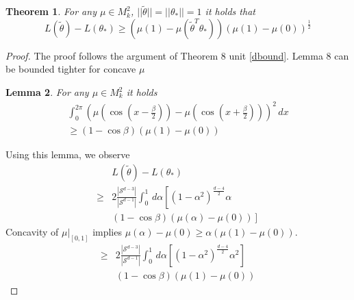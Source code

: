 \documentclass[twoside]{article} \usepackage{aistats2017}
\newtheorem{theorem}{Theorem}
\newtheorem{lemma}[theorem]{Lemma}
\begin{document}
\begin{theorem}
For any $\mu \in M_k^2$, $||\tilde{\theta}||=||\theta_*||=1$ it holds that
$$L(\tilde{\theta})-L(\theta_*) \geq (\mu(1)-\mu(\tilde{\theta}^T\theta_*) )(\mu(1)-\mu(0))^{\frac{1}{2}}$$
\end{theorem}
\begin{proof}
The proof follows the argument of Theorem 8 unit \ref{dbound}. Lemma 8 can be bounded tighter for concave $\mu$
\begin{lemma}
    For any $\mu\in M_k^2$ it holds
\begin{align*}
            \int_{0}^{2\pi}\left(\mu(\cos(x-\frac{\beta}{2}))-\mu( \cos(x+\frac{\beta}{2}))\right)^2\, dx\\
            \geq (1-\cos{\beta})(\mu(1)-\mu(0))
\end{align*}
\end{lemma}
Using this lemma, we observe
\begin{align*}
    &L(\tilde{\theta})-L(\theta_*)\\
    \geq&2\frac{|\mathcal{S}^{d-3}|}{|\mathcal{S}^{d-1}|}\int_{0}^{1}\,d\alpha\left[(1-\alpha^2)^{\frac{d-4}{2}}\alpha\right.\\
    &\left.(1-\cos{\beta})(\mu(\alpha)-\mu(0))\right]
\end{align*}
Concavity of $\mu|_{[0,1]}$ implies $\mu(\alpha)-\mu(0)\geq \alpha(\mu(1)-\mu(0))$.
\begin{align*}
    \geq&2\frac{|\mathcal{S}^{d-3}|}{|\mathcal{S}^{d-1}|}\int_{0}^{1}\,d\alpha\left[(1-\alpha^2)^{\frac{d-4}{2}}\alpha^{2}\right]\\
    &(1-\cos{\beta})(\mu(1)-\mu(0))
\end{align*}
\end{proof}
\end{document}
